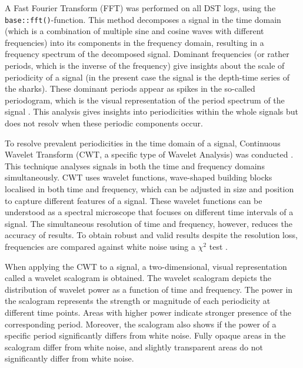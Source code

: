 \documentclass[
  authoryear,
  review,
  3p]{elsarticle}
\begin{document}
A Fast Fourier Transform (FFT) was performed on all DST logs, using the
\texttt{base::fft()}-function. This method decomposes a signal in the
time domain (which is a combination of multiple sine and cosine waves
with different frequencies) into its components in the frequency domain,
resulting in a frequency spectrum of the decomposed signal. Dominant
frequencies (or rather periods, which is the inverse of the frequency)
give insights about the scale of periodicity of a signal (in the present
case the signal is the depth-time series of the sharks). These dominant
periods appear as spikes in the so-called periodogram, which is the
visual representation of the period spectrum of the signal
\citep{cochran_1967}. This analysis gives insights into periodicities
within the whole signals but does not resolv when these periodic
components occur.

To resolve prevalent periodicities in the time domain of a signal,
Continuous Wavelet Transform (CWT, a specific type of Wavelet Analysis)
was conducted \citep{grinsted_2004}. This technique analyses signals in
both the time and frequency domains simultaneously. CWT uses wavelet
functions, wave-shaped building blocks localised in both time and
frequency, which can be adjusted in size and position to capture
different features of a signal. These wavelet functions can be
understood as a spectral microscope that focuses on different time
intervals of a signal. The simultaneous resolution of time and
frequency, however, reduces the accuracy of results. To obtain robust
and valid results despite the resolution loss, frequencies are compared
against white noise using a \(\chi^2\) test \citep{grinsted_2004}.

When applying the CWT to a signal, a two-dimensional, visual
representation called a wavelet scalogram is obtained. The wavelet
scalogram depicts the distribution of wavelet power as a function of
time and frequency. The power in the scalogram represents the strength
or magnitude of each periodicity at different time points. Areas with
higher power indicate stronger presence of the corresponding period.
Moreover, the scalogram also shows if the power of a specific period
significantly differs from white noise. Fully opaque areas in the
scalogram differ from white noise, and slightly transparent areas do not
significantly differ from white noise.
\end{document}
